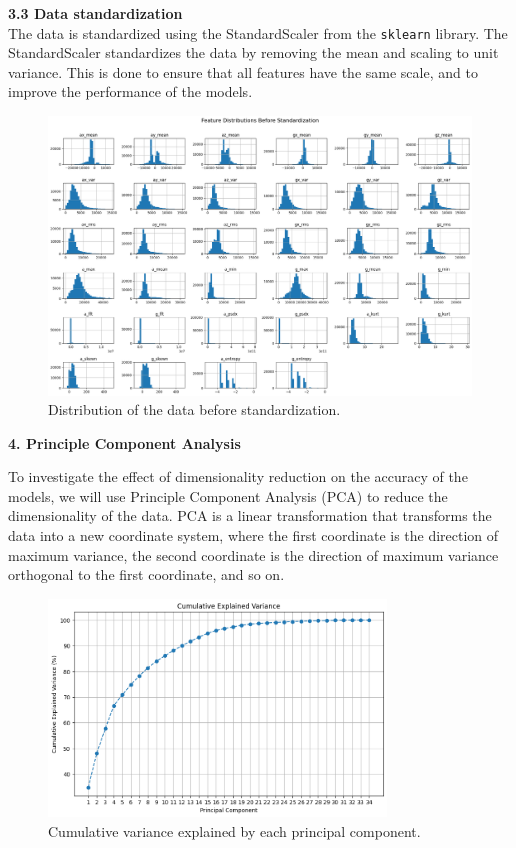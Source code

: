 \documentclass[12pt]{article}
\begin{document}
\textbf{3.3 Data standardization}
\\
The data is standardized using the StandardScaler from the \texttt{sklearn} library. The StandardScaler standardizes the data by removing the mean and scaling to unit variance. This is done to ensure that all features have the same scale, and to improve the performance of the models.

\begin{figure}[H]
\centering
\includegraphics[width=1.0\textwidth]{figures/data_distribution.png}
\caption{Distribution of the data before standardization.}
\label{fig:data_distribution}
\end{figure}


\vspace{20pt}

\textbf{4. Principle Component Analysis}

To investigate the effect of dimensionality reduction on the accuracy of the models, we will use Principle Component Analysis (PCA) to reduce the dimensionality of the data. PCA is a linear transformation that transforms the data into a new coordinate system, where the first coordinate is the direction of maximum variance, the second coordinate is the direction of maximum variance orthogonal to the first coordinate, and so on. 

\begin{figure}[H]
\centering
\includegraphics[width=0.8\textwidth]{figures/cum_var_scree.png}
\caption{Cumulative variance explained by each principal component.}
\label{fig:scree_plot}
\end{figure}
\end{document}
